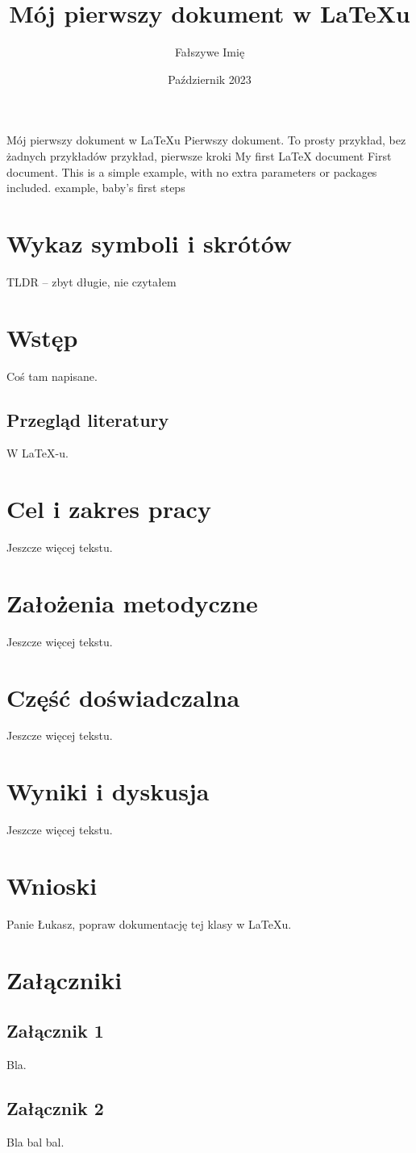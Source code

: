 \documentclass{SGGW-thesis}
\title{Mój pierwszy dokument w LaTeXu}
\author{Fałszywe Imię}
\date{Październik 2023}
\begin{document}
\maketitle
\statementpage
\abstractpage
{Mój pierwszy dokument w LaTeXu}
{Pierwszy dokument. To prosty przykład, bez żadnych przykładów}
{przykład, pierwsze kroki}
{My first LaTeX document}
{First document.  This is a simple example, with no 
extra parameters or packages included.}
{example, baby's first steps}

{
  \doublespacing
  \tableofcontents
}

\startchapterfromoddpage %

\chapter{Wykaz symboli i skrótów}
TLDR -- zbyt długie, nie czytałem

\chapter{Wstęp}
Coś tam napisane. 

\section{Przegląd literatury}
W \LaTeX-u.\cite{talbot2013}

\chapter{Cel i zakres pracy}
Jeszcze więcej tekstu.

\chapter{Założenia metodyczne}
Jeszcze więcej tekstu.

\chapter{Część doświadczalna}
Jeszcze więcej tekstu.

\chapter{Wyniki i dyskusja}
Jeszcze więcej tekstu.

\chapter{Wnioski}
Panie Łukasz, popraw dokumentację tej klasy w LaTeXu.

\chapter{Załączniki}
\section{Załącznik 1}
Bla.

\section{Załącznik 2}
Bla bal bal.



\beforelastpage[2023]
\end{document}
